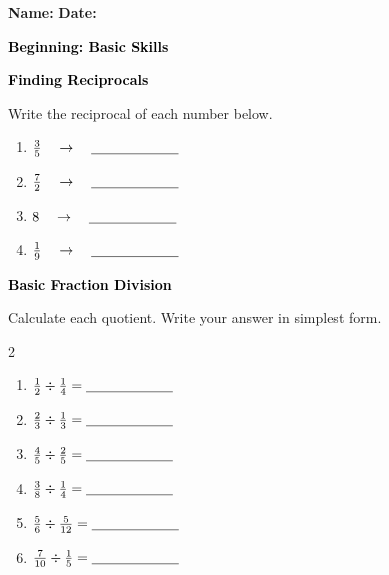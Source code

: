 \documentclass[12pt, letterpaper, fleqn]{article}
\newcommand{\blank}{\underline{\hspace{2.2cm}}}
\begin{document}
\textbf{Name:} \underline{\hspace{5cm}}
\hfill
\textbf{Date:} \underline{\hspace{3cm}}\\

\begin{tcolorbox}[colback=customteal!20]
    \large\textcolor{black}{\textbf{Beginning: Basic Skills}}
\end{tcolorbox}

\vspace{3mm}

\begin{tcolorbox}[colback=customteal!20]
\large\textcolor{black}{\textbf{Finding Reciprocals}}
\end{tcolorbox}

\noindent
Write the reciprocal of each number below.

\vspace{3mm}
\begin{enumerate}[itemsep=1cm, leftmargin=0.6cm]
\item $\frac{3}{5} \quad \rightarrow \quad \blank$
\item $\frac{7}{2} \quad \rightarrow \quad \blank$
\item $8 \quad \rightarrow \quad \blank$
\item $\frac{1}{9} \quad \rightarrow \quad \blank$
\end{enumerate}
\newpage

\begin{tcolorbox}[colback=customteal!20]
\large\textcolor{black}{\textbf{Basic Fraction Division}}
\end{tcolorbox}

\noindent
Calculate each quotient. Write your answer in simplest form.

\vspace{3mm}
\begin{multicols}{2}
\begin{enumerate}[itemsep=1cm, leftmargin=0.6cm]
\item $\frac{1}{2} \div \frac{1}{4} = \blank$
\item $\frac{2}{3} \div \frac{1}{3} = \blank$
\item $\frac{4}{5} \div \frac{2}{5} = \blank$
\item $\frac{3}{8} \div \frac{1}{4} = \blank$
\item $\frac{5}{6} \div \frac{5}{12} = \blank$
\item $\frac{7}{10} \div \frac{1}{5} = \blank$
\end{enumerate}
\end{multicols}
\newpage
\end{document}
